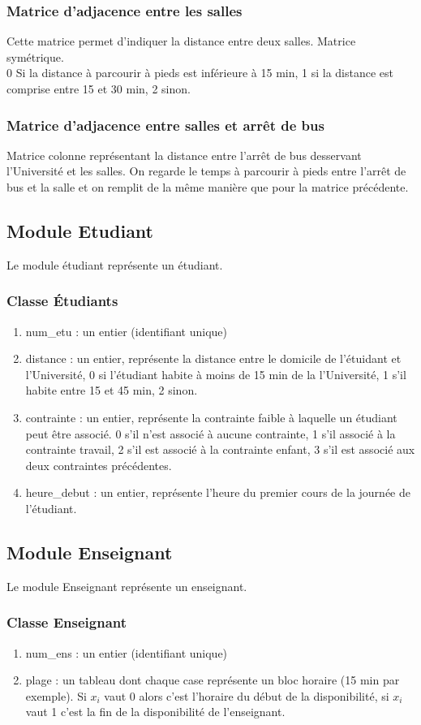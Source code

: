 \documentclass[a4paper,11pt]{article}
\begin{document}
		\subsubsection{Matrice d'adjacence entre les salles}
			Cette matrice permet d'indiquer la distance entre deux salles. Matrice symétrique.\\ 0 Si la distance à parcourir à pieds est inférieure à 15 min, 1 si la distance est comprise entre 15 et 30 min, 2 sinon.
		\subsubsection{Matrice d'adjacence entre salles et arrêt de bus}
			Matrice colonne représentant la distance entre l'arrêt de bus desservant l'Université et les salles. On regarde le temps à parcourir à pieds entre l'arrêt de bus et la salle et on remplit de la même manière que pour la matrice précédente.
	\subsection{Module Etudiant}
		Le module étudiant représente un étudiant.
		\subsubsection{Classe Étudiants}
		\begin{enumerate}
			\item num\_etu : un entier (identifiant unique)
			\item distance : un entier, représente la distance entre le domicile de l'étuidant et l'Université, 0 si l'étudiant habite à moins de 15 min de la l'Université, 1 s'il habite entre 15 et 45 min, 2 sinon.
			\item contrainte : un entier, représente la contrainte faible à laquelle un étudiant peut être associé. 0 s'il n'est associé à aucune contrainte, 1 s'il associé à la contrainte travail, 2 s'il est associé à la contrainte enfant, 3 s'il est associé aux deux contraintes précédentes. 
			\item heure\_debut : un entier, représente l'heure du premier cours de la journée de l'étudiant.
			\end{enumerate}
	\subsection{Module Enseignant}
		Le module Enseignant représente un enseignant.
		\subsubsection{Classe Enseignant}
		\begin{enumerate}
			\item num\_ens : un entier (identifiant unique)
			\item plage : un tableau dont chaque case représente un bloc horaire (15 min par exemple). Si $x_i$ vaut 0 alors c'est l'horaire du début de la disponibilité, si $x_i$ vaut 1 c'est la fin de la disponibilité de l'enseignant.
			\end{enumerate}
\end{document}
